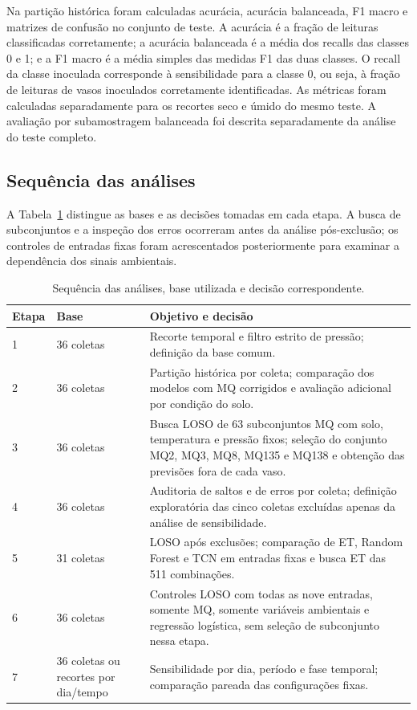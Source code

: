 Na partição histórica foram calculadas acurácia, acurácia balanceada,
F1 macro e matrizes de confusão no conjunto de teste. A acurácia é a
fração de leituras
classificadas corretamente; a acurácia balanceada é a média dos recalls
das classes 0 e 1; e a F1 macro é a média simples das medidas F1 das duas
classes. O recall da classe inoculada corresponde à sensibilidade
para a classe 0, ou seja, à fração de leituras de vasos inoculados
corretamente identificadas. As métricas foram calculadas separadamente
para os recortes seco e úmido do mesmo teste. A avaliação por
subamostragem balanceada foi descrita separadamente da análise do teste
completo.

\subsection{Sequência das análises}
\label{subsec:sequencia_analises}

A Tabela~\ref{tab:cronologia_analises} distingue as bases e as decisões
tomadas em cada etapa. A busca de subconjuntos e a inspeção dos erros
ocorreram antes da análise pós-exclusão; os controles de entradas fixas
foram acrescentados posteriormente para examinar a dependência dos
sinais ambientais.

\begin{table}[H]
    \centering
    \footnotesize
    \caption{Sequência das análises, base utilizada e decisão correspondente.}
    \label{tab:cronologia_analises}
    \begin{tabular}{p{}p{}p{}}
        \hline
        Etapa & Base & Objetivo e decisão \\
        \hline
        1 & 36 coletas & Recorte temporal e filtro estrito de pressão; definição da base comum. \\
        2 & 36 coletas & Partição histórica por coleta; comparação dos modelos com MQ corrigidos e avaliação adicional por condição do solo. \\
        3 & 36 coletas & Busca LOSO de 63 subconjuntos MQ com solo, temperatura e pressão fixos; seleção do conjunto MQ2, MQ3, MQ8, MQ135 e MQ138 e obtenção das previsões fora de cada vaso. \\
        4 & 36 coletas & Auditoria de saltos e de erros por coleta; definição exploratória das cinco coletas excluídas apenas da análise de sensibilidade. \\
        5 & 31 coletas & LOSO após exclusões; comparação de ET, Random Forest e TCN em entradas fixas e busca ET das 511 combinações. \\
        6 & 36 coletas & Controles LOSO com todas as nove entradas, somente MQ, somente variáveis ambientais e regressão logística, sem seleção de subconjunto nessa etapa. \\
        7 & 36 coletas ou recortes por dia/tempo & Sensibilidade por dia, período e fase temporal; comparação pareada das configurações fixas. \\
        \hline
    \end{tabular}
\end{table}




